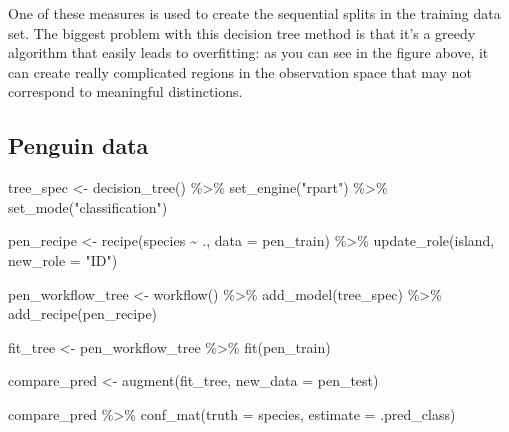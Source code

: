 \documentclass[
  letterpaper,
  DIV=11,
  numbers=noendperiod]{scrreprt}
\newenvironment{Shaded}{\begin{snugshade}}{\end{snugshade}}
\newcommand{\AttributeTok}[1]{\textcolor[rgb]{0.40,0.45,0.13}{#1}}
\newcommand{\FunctionTok}[1]{\textcolor[rgb]{0.28,0.35,0.67}{#1}}
\newcommand{\NormalTok}[1]{\textcolor[rgb]{0.00,0.23,0.31}{#1}}
\newcommand{\OtherTok}[1]{\textcolor[rgb]{0.00,0.23,0.31}{#1}}
\newcommand{\SpecialCharTok}[1]{\textcolor[rgb]{0.37,0.37,0.37}{#1}}
\newcommand{\StringTok}[1]{\textcolor[rgb]{0.13,0.47,0.30}{#1}}
\begin{document}
One of these measures is used to create the sequential splits in the
training data set. The biggest problem with this decision tree method is
that it's a greedy algorithm that easily leads to overfitting: as you
can see in the figure above, it can create really complicated regions in
the observation space that may not correspond to meaningful
distinctions.

\hypertarget{penguin-data-1}{%
\subsection{Penguin data}\label{penguin-data-1}}

\begin{Shaded}
\begin{Highlighting}[]
\NormalTok{tree\_spec }\OtherTok{\textless{}{-}} \FunctionTok{decision\_tree}\NormalTok{() }\SpecialCharTok{\%\textgreater{}\%}
  \FunctionTok{set\_engine}\NormalTok{(}\StringTok{"rpart"}\NormalTok{) }\SpecialCharTok{\%\textgreater{}\%}
  \FunctionTok{set\_mode}\NormalTok{(}\StringTok{"classification"}\NormalTok{)}
\end{Highlighting}
\end{Shaded}

\begin{Shaded}
\begin{Highlighting}[]
\NormalTok{pen\_recipe }\OtherTok{\textless{}{-}} 
  \FunctionTok{recipe}\NormalTok{(species }\SpecialCharTok{\textasciitilde{}}\NormalTok{ ., }\AttributeTok{data =}\NormalTok{ pen\_train) }\SpecialCharTok{\%\textgreater{}\%} 
  \FunctionTok{update\_role}\NormalTok{(island,  }\AttributeTok{new\_role =} \StringTok{"ID"}\NormalTok{)}

\NormalTok{pen\_workflow\_tree }\OtherTok{\textless{}{-}} \FunctionTok{workflow}\NormalTok{() }\SpecialCharTok{\%\textgreater{}\%}
  \FunctionTok{add\_model}\NormalTok{(tree\_spec) }\SpecialCharTok{\%\textgreater{}\%}
  \FunctionTok{add\_recipe}\NormalTok{(pen\_recipe)}

\NormalTok{fit\_tree }\OtherTok{\textless{}{-}}\NormalTok{ pen\_workflow\_tree }\SpecialCharTok{\%\textgreater{}\%} \FunctionTok{fit}\NormalTok{(pen\_train)}
\end{Highlighting}
\end{Shaded}

\begin{Shaded}
\begin{Highlighting}[]
\NormalTok{compare\_pred }\OtherTok{\textless{}{-}} \FunctionTok{augment}\NormalTok{(fit\_tree, }\AttributeTok{new\_data =}\NormalTok{ pen\_test) }

\NormalTok{compare\_pred }\SpecialCharTok{\%\textgreater{}\%} \FunctionTok{conf\_mat}\NormalTok{(}\AttributeTok{truth =}\NormalTok{ species, }\AttributeTok{estimate =}\NormalTok{ .pred\_class)}
\end{Highlighting}
\end{Shaded}
\end{document}
